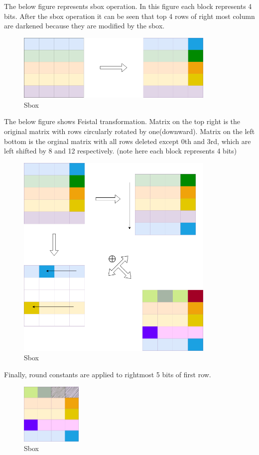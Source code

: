 \documentclass[final]{transcrypto}
\begin{document}
The below figure represents sbox operation. In this figure each block represents 4 bits. After the sbox operation it can be seen that top 4 rows of right most column are darkened because they are modified by the sbox.
\begin{figure}[H]
\caption{Sbox}
\centering
\includegraphics[width=0.85\textwidth]{images/key_s_sbox.png}
\end{figure}
The below figure shows Feistal transformation. Matrix on the top right is the original matrix with rows circularly rotated by one(downward). Matrix on the left bottom is the orginal matrix with all rows deleted except 0th and 3rd, which are left shifted by 8 and 12 respectively. (note here each block represents 4 bits)
\begin{figure}[H]
\caption{Sbox}
\centering
\includegraphics[width=0.85\textwidth]{images/key_s_f.png}
\end{figure}
Finally, round constants are applied to rightmost 5 bits of first row.
\begin{figure}[H]
\caption{Sbox}
\centering
\includegraphics[width=0.26\textwidth]{images/key_s_rc.png}
\end{figure}
\end{document}
